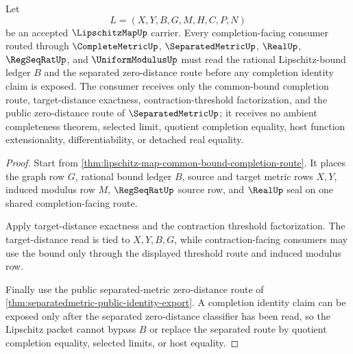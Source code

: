 \begin{theorem}
\label{thm:lipschitz-map-separated-completion-nonescape}
Let
$$
L=(X,Y,B,G,M,H,C,P,N)
$$
be an accepted $\LipschitzMapUp$ carrier. Every completion-facing consumer routed through $\CompleteMetricUp$, $\SeparatedMetricUp$, $\RealUp$, $\RegSeqRatUp$, and $\UniformModulusUp$ must read the rational Lipschitz-bound ledger $B$ and the separated zero-distance route before any completion identity claim is exposed. The consumer receives only the common-bound completion route, target-distance exactness, contraction-threshold factorization, and the public zero-distance route of $\SeparatedMetricUp$; it receives no ambient completeness theorem, selected limit, quotient completion equality, host function extensionality, differentiability, or detached real equality.
\end{theorem}
\begin{proof}
Start from \autoref{thm:lipschitz-map-common-bound-completion-route}. It places the graph row $G$, rational bound ledger $B$, source and target metric rows $X,Y$, induced modulus row $M$, $\RegSeqRatUp$ source row, and $\RealUp$ seal on one shared completion-facing route.

Apply target-distance exactness and the contraction threshold factorization. The target-distance read is tied to $X,Y,B,G$, while contraction-facing consumers may use the bound only through the displayed threshold route and induced modulus row.

Finally use the public separated-metric zero-distance route of \autoref{thm:separatedmetric-public-identity-export}. A completion identity claim can be exposed only after the separated zero-distance classifier has been read, so the Lipschitz packet cannot bypass $B$ or replace the separated route by quotient completion equality, selected limits, or host equality.
\end{proof}

